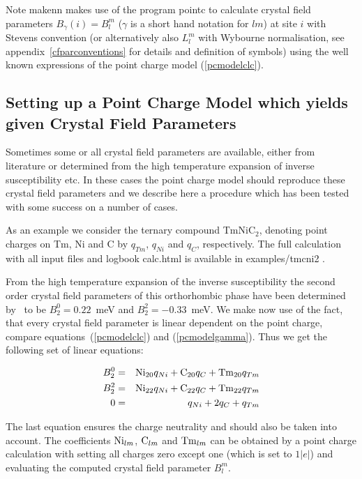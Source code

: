 Note {\prg makenn}  makes use of the program {\prg pointc} to calculate 
crystal field parameters $B_{\gamma}(i)=B_l^m$ ($\gamma$ is a short hand
notation for $lm$) at site $i$  with Stevens convention (or alternatively also $L_l^m$ with
Wybourne normalisation, see appendix~\ref{cfparconventions} for details and definition of symbols) 
using the well known expressions of the point charge model (\ref{pcmodelclc}).



\subsection{Setting up a Point Charge Model which yields given Crystal Field Parameters}\label{determinePcmodel}

Sometimes some or all crystal field parameters are available, either from literature or determined from
the high temperature expansion of inverse susceptibility etc.  In these cases the point charge model
should reproduce these crystal field parameters and we describe here a procedure which has been tested
with some success on a number of cases.

As an example we consider the ternary compound TmNiC$_2$, denoting point charges on
Tm, Ni and C by $q_{Tm}$, $q_{Ni}$ and $q_{C}$, respectively.
The full calculation with all input files and logbook {\prg calc.html} is available in {\prg examples/tmcni2 }.

From the high temperature expansion of the inverse susceptibility the second order crystal field
parameters of this orthorhombic phase have been determined by~\cite{roman23-125137}
to be $B_2^0=0.22$~meV and $B_2^2=-0.33$~meV. 
We make now use of the fact, that every crystal field parameter is linear dependent on
the point charge, compare equations~(\ref{pcmodelclc}) and (\ref{pcmodelgamma}).
Thus we get the following set of linear equations:

\begin{eqnarray}\label{pclinredproblem}
B_2^0 &=& {\rm Ni}_{20} q_{Ni}+{\rm C}_{20} q_{C}+{\rm Tm}_{20} q_{Tm} \nonumber \\
B_2^2 &=& {\rm Ni}_{22} q_{Ni}+{\rm C}_{22} q_{C}+{\rm Tm}_{22} q_{Tm} \nonumber \\
0 &=& q_{Ni}+2 q_{C}+ q_{Tm} 
\end{eqnarray}

The last equation ensures the charge neutrality and should also be taken into account.
The coefficients ${\rm Ni}_{lm}$, ${\rm C}_{lm}$ and ${\rm Tm}_{lm}$ can be obtained by
a point charge calculation with setting all charges zero except one (which is set to $1|e|$) and
evaluating the computed crystal field parameter $B_l^m$. 

